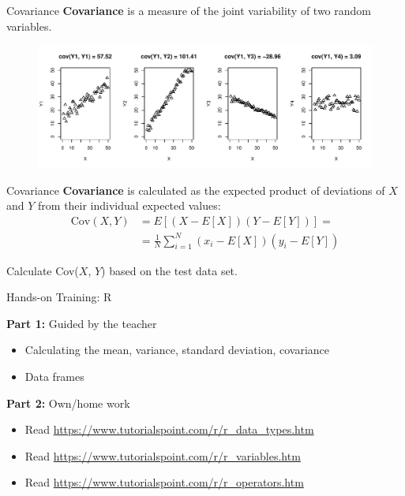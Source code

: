 \begin{frame}{Covariance}
    \textbf{Covariance} is a measure of the joint variability of two random variables.
    \begin{figure}
        \includegraphics[width=\textwidth]{R/plots/covariance}
    \end{figure}
\end{frame}

\begin{frame}{Covariance}
    \textbf{Covariance} is calculated as the expected product of deviations of $X$ and $Y$ from their individual expected values:   
    \begin{align}
    \text{Cov}(X, Y) &= E[(X - E[X])(Y - E[Y])] = \\
    &= \frac{1}{N} \sum_{i=1}^{N}(x_i - E[X])(y_i - E[Y])
    \end{align}
    
    \begin{example}
        \medskip
        Calculate Cov($X$, $Y$) based on the test data set.
    \end{example}
\end{frame}

\begin{frame}{Hands-on Training: R}

    \textbf{Part 1:} Guided by the teacher
    \begin{itemize}
        \item Calculating the mean, variance, standard deviation, covariance
        \item Data frames
    \end{itemize}

    \textbf{Part 2:} Own/home work
    \begin{itemize}
        \item Read {\small \url{https://www.tutorialspoint.com/r/r_data_types.htm}}
        \item Read {\small \url{https://www.tutorialspoint.com/r/r_variables.htm}}
        \item Read {\small \url{https://www.tutorialspoint.com/r/r_operators.htm}}
    \end{itemize}

\end{frame}